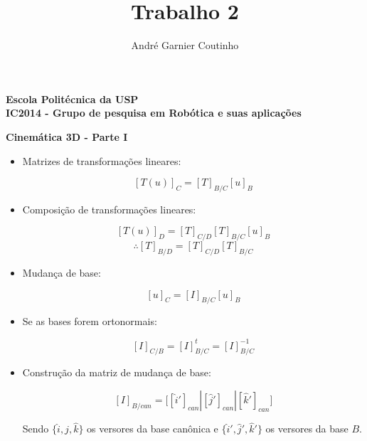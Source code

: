 \documentclass[12pt,a4paper]{article}
\title{Trabalho 2}
\author{André Garnier Coutinho}
\begin{document}
\begin{center}
\textbf{Escola Politécnica da USP\\
IC2014 - Grupo de pesquisa em Robótica e suas aplicações\\}
\end{center}

\begin{center}
\textbf{Cinemática 3D - Parte I}
\end{center}


\begin{itemize}



\item Matrizes de transformações lineares:

$$ [T(u)]_{C} = [T]_{B/C} [u]_{B}  $$
\linebreak

\item Composição de transformações lineares: 

$$ [T(u)]_{D} = [T]_{C/D} [T]_{B/C} [u]_{B} $$
$$ \therefore [T]_{B/D} = [T]_{C/D} [T]_{B/C} $$
\linebreak

\item Mudança de base:

$$ [u]_{C} = [I]_{B/C} [u]_{B} $$
\linebreak

\item Se as bases forem ortonormais:

$$ [I]_{C/B} = [I]_{B/C}^t = [I]_{B/C}^{-1}  $$
\linebreak

\item Construção da matriz de mudança de base:

$$ [I]_{B/can} = \Big[ [ \hat{i}  ']_{can} | [\hat{j} ']_{can} | [\hat{k} ']_{can} \Big] $$


Sendo $  \{ \hat{i}  , \hat{j} , \hat{k} \} $ os versores da base canônica e $  \{ \hat{i}' , \hat{j}' , \hat{k}' \}  $ os versores da base $B$.
\linebreak

\end{itemize}
\pagebreak

\end{document}
